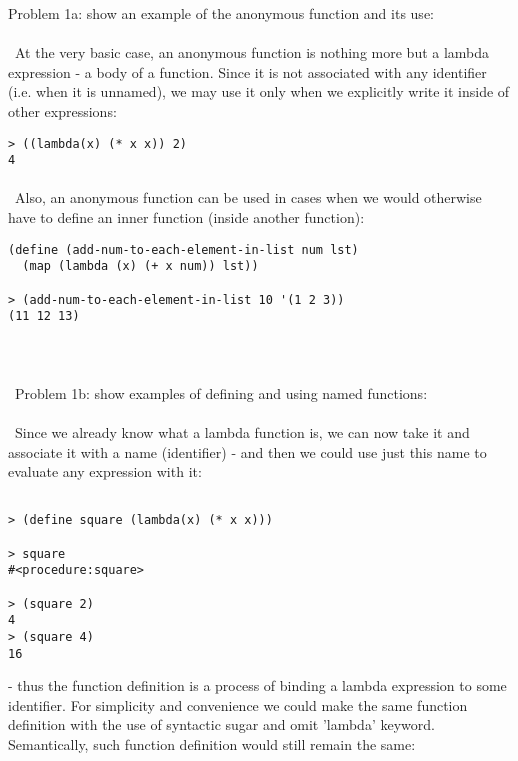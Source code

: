 \documentclass{article}
\begin{document}
Problem 1a: show an example of the anonymous function and its use:
\paragraph{}\
At the very basic case, an anonymous function is nothing more but a lambda expression - a body of a function. Since it is not associated with any identifier (i.e. when it is unnamed), we may use it only when we explicitly write it inside of other expressions:
\ttfamily
	
\begin{verbatim} 
> ((lambda(x) (* x x)) 2) 
4
\end{verbatim}

\rmfamily
\paragraph{}\
Also, an anonymous function can be used in cases when we would otherwise have to define an inner function (inside another function):

\begin{verbatim} 
(define (add-num-to-each-element-in-list num lst)
  (map (lambda (x) (+ x num)) lst))
  
> (add-num-to-each-element-in-list 10 '(1 2 3))
(11 12 13)
\end{verbatim}

\paragraph{}\
\paragraph{}\
Problem 1b: show examples of defining and using named functions:
\paragraph{}\
Since we already know what a lambda function is, we can now take it and associate it with a name (identifier) - and then we could use just this name to evaluate any expression with it:

\begin{verbatim} 
 
> (define square (lambda(x) (* x x)))

> square
#<procedure:square>

> (square 2)
4
> (square 4)
16
\end{verbatim}
- thus the function definition is a process of binding a lambda expression to some identifier. For simplicity and convenience we could make the same function definition with the use of syntactic sugar and omit 'lambda' keyword. Semantically, such function definition would still remain the same:
\end{document}
